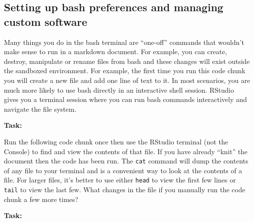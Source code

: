 \documentclass[
]{article}
\newenvironment{Shaded}{\begin{snugshade}}{\end{snugshade}}
\newcommand{\BuiltInTok}[1]{#1}
\newcommand{\CommentTok}[1]{\textcolor[rgb]{0.56,0.35,0.01}{\textit{#1}}}
\newcommand{\FunctionTok}[1]{\textcolor[rgb]{0.00,0.00,0.00}{#1}}
\newcommand{\NormalTok}[1]{#1}
\newcommand{\OperatorTok}[1]{\textcolor[rgb]{0.81,0.36,0.00}{\textbf{#1}}}
\newcommand{\StringTok}[1]{\textcolor[rgb]{0.31,0.60,0.02}{#1}}
\newcommand{\VariableTok}[1]{\textcolor[rgb]{0.00,0.00,0.00}{#1}}
\begin{document}
\hypertarget{setting-up-bash-preferences-and-managing-custom-software}{%
\subsection{Setting up bash preferences and managing custom
software}\label{setting-up-bash-preferences-and-managing-custom-software}}

Many things you do in the bash terminal are ``one-off'' commands that
wouldn't make sense to run in a markdown document. For example, you can
create, destroy, manipulate or rename files from bash and these changes
will exist outside the sandboxed environment. For example, the first
time you run this code chunk you will create a new file and add one line
of text to it. In most scenarios, you are much more likely to use bash
directly in an interactive shell session. RStudio gives you a terminal
session where you can run bash commands interactively and navigate the
file system.

\textbf{Task:}

Run the following code chunk once then use the RStudio terminal (not the
Console) to find and view the contents of that file. If you have already
``knit'' the document then the code has been run. The \texttt{cat}
command will dump the contents of any file to your terminal and is a
convenient way to look at the contents of a file. For larger files, it's
better to use either \texttt{head} to view the first few lines or
\texttt{tail} to view the last few. What changes in the file if you
manually run the code chunk a few more times?

\begin{Shaded}
\end{Shaded}

\textbf{Task:}
\end{document}
